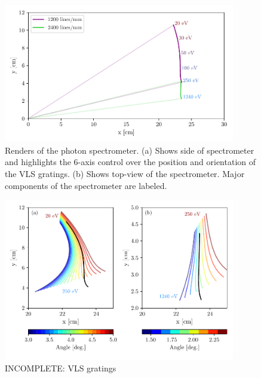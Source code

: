 \begin{figure}
	\centering
	\includegraphics[width=0.9\textwidth]{figures/Beamline/VLS_flat_field.pdf}
	\caption[Renders of the photon spectrometer]{Renders of the photon spectrometer. (a) Shows side of spectrometer and highlights the 6-axis control over the position and orientation of the VLS gratings.  (b) Shows top-view of the spectrometer.  Major components of the spectrometer are labeled.}
	\label{fig:VLS_flat_field}
\end{figure}

\begin{figure}
	\centering
	\includegraphics[width=0.9\textwidth]{figures/Beamline/variable_flat_field.pdf}
	\caption{INCOMPLETE: VLS gratings}
	\label{fig:variable_flat_field}
\end{figure}

